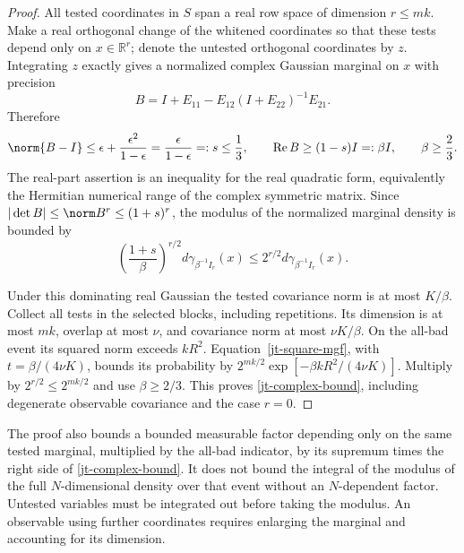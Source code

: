 \begin{proof}
All tested coordinates in $S$ span a real row space of dimension
$r\le mk$. Make a real orthogonal change of the whitened
coordinates so that these tests depend only on $x\in\mathbb R^r$;
denote the untested orthogonal coordinates by $z$. Integrating
$z$ exactly gives a normalized complex Gaussian marginal on
$x$ with precision
\begin{equation}\label{jt-marginal-precision}
 B=I+E_{11}-E_{12}(I+E_{22})^{-1}E_{21}.
\end{equation}
Therefore
\begin{equation}\label{jt-marginal-control}
 \norm{B-I}\le\epsilon+\frac{\epsilon^2}{1-\epsilon}
       =\frac{\epsilon}{1-\epsilon}=:s\le\frac13,
 \qquad \operatorname{Re}B\ge(1-s)I=:\beta I,
 \qquad \beta\ge\frac23.
\end{equation}
The real-part assertion is an inequality for the real quadratic
form, equivalently the Hermitian numerical range of the complex
symmetric matrix. Since
$|\det B|\le\norm B^r\le(1+s)^r$, the modulus of the
normalized marginal density is bounded by
\begin{equation}\label{jt-marginal-domination}
 \left(\frac{1+s}{\beta}\right)^{r/2}
                d\gamma_{\beta^{-1}I_r}(x)
 \le 2^{r/2}d\gamma_{\beta^{-1}I_r}(x).
\end{equation}

Under this dominating real Gaussian the tested covariance norm
is at most $K/\beta$. Collect all tests in the selected blocks,
including repetitions. Its dimension is at most $mk$, overlap
at most $\nu$, and covariance norm at most $\nu K/\beta$.
On the all-bad event its squared norm exceeds $kR^2$.
Equation~\eqref{jt-square-mgf}, with
$t=\beta/(4\nu K)$, bounds its probability by
$2^{mk/2}\exp[-\beta kR^2/(4\nu K)]$.
Multiply by $2^{r/2}\le2^{mk/2}$ and use $\beta\ge2/3$.
This proves \eqref{jt-complex-bound}, including degenerate
observable covariance and the case $r=0$.
\end{proof}

The proof also bounds a bounded measurable factor depending
only on the same tested marginal, multiplied by the all-bad
indicator, by its supremum times the right side of
\eqref{jt-complex-bound}. It does not bound the integral of
the modulus of the full $N$-dimensional density over that
event without an $N$-dependent factor. Untested variables must
be integrated out before taking the modulus. An observable
using further coordinates requires enlarging the marginal
and accounting for its dimension.

